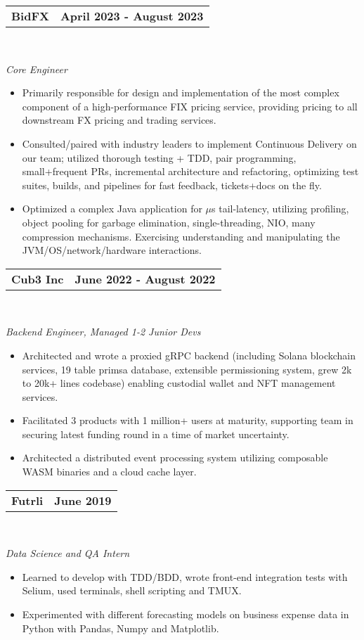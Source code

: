 \documentclass[letterpaper,oneside,10.8pt]{article}
\makeatletter
\newcommand{\titleAndDate}[2]{
  \small{
  \vspace{-1pt}
    \begin{tabular*}{1\textwidth}{l@{\extracolsep{\fill}}r}
      \textbf{#1} & \textbf{#2} \\
    \end{tabular*}\vspace{-1pt} \\
  }
}
\newcommand{\normalText}[1]{
  \small{
    {#1}
  }\vspace{-1pt}\\
}
\newcommand{\italicText}[1]{
  \small{
    \textit{#1}
  }\vspace{-1pt} \\
}
\makeatother
\begin{document}
  \titleAndDate{BidFX}{April 2023 - August 2023}
  \italicText{Core Engineer}
  \begin{itemize}[leftmargin=10pt]
    \vspace{-1pt}
    \item\normalText{Primarily responsible for design and implementation of the most complex component of a high-performance FIX pricing service, providing pricing to all downstream FX pricing and trading services.}
    \item\normalText{Consulted/paired with industry leaders to implement Continuous Delivery on our team; utilized thorough testing + TDD, pair programming, small+frequent PRs, incremental architecture and refactoring, optimizing test suites, builds, and pipelines for fast feedback, tickets+docs on the fly.}
    \item\normalText{Optimized a complex Java application for \begin{math}\mu\end{math}s tail-latency, utilizing profiling, object pooling for garbage elimination, single-threading, NIO, many compression mechanisms. Exercising understanding and manipulating the JVM/OS/network/hardware interactions.}
  \end{itemize}
  
  \vspace{4pt}
  
  \titleAndDate{Cub3 Inc}{June 2022 - August 2022}
  \italicText{Backend Engineer, Managed 1-2 Junior Devs}
  \begin{itemize}[leftmargin=10pt]
    \vspace{-1pt}
    \item\normalText{Architected and wrote a proxied gRPC backend (including Solana blockchain services, 19 table primsa database, extensible permissioning system, grew 2k to 20k+ lines codebase) enabling custodial wallet and NFT management services.}
    \item\normalText{Facilitated 3 products with 1 million+ users at maturity, supporting team in securing latest funding round in a time of market uncertainty.}
    \item\normalText{Architected a distributed event processing system utilizing composable WASM binaries and a cloud cache layer. }
  \end{itemize}

  \vspace{4pt}
  
  \titleAndDate{Futrli}{June 2019}
  \italicText{Data Science and QA Intern}
  \begin{itemize}[leftmargin=10pt]
    \item\normalText{Learned to develop with TDD/BDD, wrote front-end integration tests with Selium, used terminals, shell scripting and TMUX.}
    \item\normalText{Experimented with different forecasting models on business expense data in Python with Pandas, Numpy and Matplotlib. }
  \end{itemize}
\end{document}
